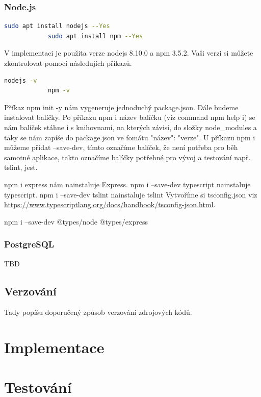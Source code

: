 \documentclass[thesis=B,czech]{FITthesis}[2012/06/26]
\begin{document}
        \subsection{Node.js}
            \begin{lstlisting}[language=bash,caption={Instalace Node.js a npm}]
            sudo apt install nodejs --Yes
            sudo apt install npm --Yes
            \end{lstlisting}
            V implementaci je použita verze nodejs 8.10.0 a npm 3.5.2. Vaši verzi si můžete zkontrolovat pomocí následujích příkazů.
            \begin{lstlisting}[language=bash,caption={Zkontrolování verze Node.js a npm}]
            nodejs -v
            npm -v
            \end{lstlisting}

            Příkaz npm init -y nám vygeneruje jednoduchý package.json.
            Dále budeme instalovat balíčky. Po příkazu npm i název balíčku (viz command npm help i) se nám balíček stáhne i s knihovnami, na kterých závisí, do složky node_modules a taky se nám zapíše do package.json ve fomátu "název": "verze". U příkazu npm i můžeme přidat --save-dev, tímto označíme balíček, že není potřeba pro běh samotné aplikace, takto označíme balíčky potřebné pro vývoj a testování např. tslint, jest.


            npm i express nám nainstaluje Express.
            npm i --save-dev typescript nainstaluje typescript.
            npm i --save-dev tslint nainstaluje tslint
            Vytvoříme si tsconfig.json viz \url{https://www.typescriptlang.org/docs/handbook/tsconfig-json.html}.

            npm i --save-dev @types/node @types/express

        \subsection{PostgreSQL}
            TBD
    \section{Verzování}
        Tady popíšu doporučený způsob verzování zdrojových kódů.

\chapter{Implementace}

\chapter{Testování}
\end{document}
